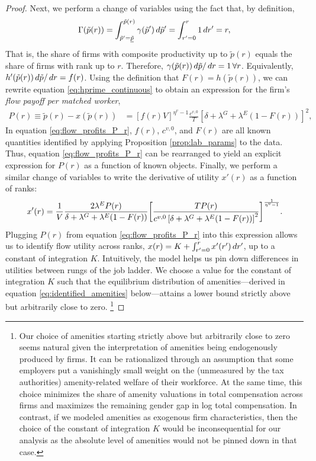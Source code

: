\begin{proof}
    Next, we perform a change of variables using the fact that, by definition,
    \begin{align}
        \Gamma(\tilde{p}(r)) = \int_{\tilde{p}'=\uline{\tilde{p}}}^{\tilde{p}(r)} \gamma(\tilde{p}') \diff \tilde{p}' = \int_{r'=0}^{r} 1 \diff r' = r, \label{eq:Gamma_r}
    \end{align}
    That is, the share of firms with composite productivity up to $\tilde{p}(r)$ equals the share of firms with rank up to $r$. Therefore, $\gamma(\tilde{p}(r)) \mathop{}\!{d} \tilde{p} / \mathop{}\!{d} r = 1 \, \forall r$. Equivalently, $h'(\tilde{p}(r)) \mathop{}\!{d} \tilde{p} / \mathop{}\!{d} r = f(r)$. Using the definition that $F(r) = h(\tilde{p}(r))$, we can rewrite equation \eqref{eq:hprime_continuous} to obtain an expression for the firm's \emph{flow payoff per matched worker},
    \begin{align}
        P(r) \equiv \tilde{p}(r) - x(\tilde{p}(r)) &= \left[ f(r) V \right]^{\eta^{v} - 1} \frac{c^{v,0}}{T} \left[\delta+\lambda^{G}+\lambda^{E}(1-F(r))\right]^{2}, \label{eq:flow_profits_P_r}
    \end{align}
    In equation \eqref{eq:flow_profits_P_r}, $f(r)$, $c^{v,0}$, and $F(r)$ are all known quantities identified by applying Proposition \ref{prop:lab_params} to the data. Thus, equation \eqref{eq:flow_profits_P_r} can be rearranged to yield an explicit expression for $P(r)$ as a function of known objects. Finally, we perform a similar change of variables to write the derivative of utility $x'(r)$ as a function of ranks:
    \begin{align}
        x'(r) =  \frac{1}{V} \frac{2 \lambda^{E} P(r)}{\delta + \lambda^{G} + \lambda^{E} (1 - F(r))}  \biggr{[} \frac{T P(r)}{c^{v,0} \left[ \delta + \lambda^{G} + \lambda^{E} (1 - F(r)) \right]^2} \biggr{]}^{\frac{1}{\eta^{v}-1}}.\label{eq:x_prime}
    \end{align}
    Plugging $P(r)$ from equation \eqref{eq:flow_profits_P_r} into this expression allows us to identify flow utility across ranks, $x(r) = K + \int_{r'=0}^{r} x'(r') \mathop{}\!{d} r'$, up to a constant of integration $K$. Intuitively, the model helps us pin down differences in utilities between rungs of the job ladder. We choose a value for the constant of integration $K$ such that the equilibrium distribution of amenities---derived in equation \eqref{eq:identified_amenities} below---attains a lower bound strictly above but arbitrarily close to zero.%
    \footnote{Our choice of amenities starting strictly above but arbitrarily close to zero seems natural given the interpretation of amenities being endogenously produced by firms. It can be rationalized through an assumption that some employers put a vanishingly small weight on the (unmeasured by the tax authorities) amenity-related welfare of their workforce. At the same time, this choice minimizes the share of amenity valuations in total compensation across firms and maximizes the remaining gender gap in log total compensation. In contrast, if we modeled amenities as exogenous firm characteristics, then the choice of the constant of integration $K$ would be inconsequential for our analysis as the absolute level of amenities would not be pinned down in that case.} %


\end{proof}
